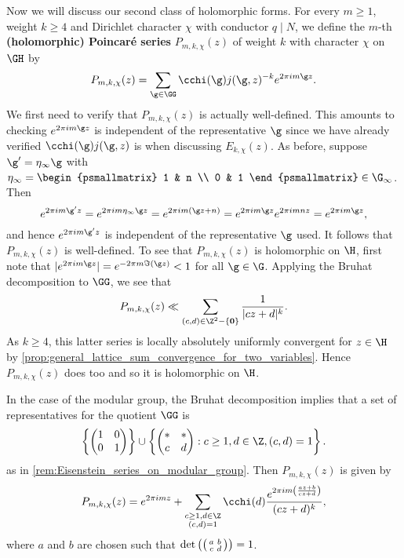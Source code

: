     Now we will discuss our second class of holomorphic forms. For every $m \ge 1$, weight $k \ge 4$ and Dirichlet character $\chi$ with conductor $q \mid N$, we define the $m$-th \textbf{(holomorphic) Poincar\'e series} $P_{m,k,\chi}(z)$ of weight $k$ with character $\chi$ on $\GH$ by
    \[
      P_{m,k,\chi}(z) = \sum_{\g \in \GG}\cchi(\g)j(\g,z)^{-k}e^{2\pi im\g z}.
    \]
    We first need to verify that $P_{m,k,\chi}(z)$ is actually well-defined. This amounts to checking $e^{2\pi im\g z}$ is independent of the representative $\g$ since we have already verified $\cchi(\g)j(\g,z)$ is when discussing $E_{k,\chi}(z)$. As before, suppose $\g' = \eta_{\infty}\g$ with $\eta_{\infty} = \begin{psmallmatrix} 1 & n \\ 0 & 1 \end{psmallmatrix} \in \G_{\infty}$. Then
    \[
      e^{2\pi im\g' z} = e^{2\pi im\eta_{\infty}\g z} = e^{2\pi im(\g z+n)} = e^{2\pi im\g z}e^{2\pi imnz} = e^{2\pi im\g z},
    \]
    and hence $e^{2\pi im\g' z}$ is independent of the representative $\g$ used. It follows that $P_{m,k,\chi}(z)$ is well-defined. To see that $P_{m,k,\chi}(z)$ is holomorphic on $\H$, first note that $|e^{2\pi im\g z}| = e^{-2\pi m\Im(\g z)} < 1$ for all $\g \in \G$. Applying the Bruhat decomposition to $\GG$, we see that
    \[
      P_{m,k,\chi}(z) \ll \sum_{(c,d) \in \Z^{2}-\{\mathbf{0}\}}\frac{1}{|cz+d|^{k}}.
    \]
    As $k \ge 4$, this latter series is locally absolutely uniformly convergent for $z \in \H$ by \cref{prop:general_lattice_sum_convergence_for_two_variables}. Hence $P_{m,k,\chi}(z)$ does too and so it is holomorphic on $\H$.

    \begin{remark}
      In the case of the modular group, the Bruhat decomposition implies that a set of representatives for the quotient $\GG$ is
    \[
      \left\{\begin{pmatrix} 1 & 0 \\ 0 & 1 \end{pmatrix}\right\} \cup \left\{\begin{pmatrix} \ast & \ast \\ c & d \end{pmatrix}:c \ge 1, d \in \Z, (c,d) = 1\right\}.
    \]
    as in \cref{rem:Eisenstein_series_on_modular_group}. Then $P_{m,k,\chi}(z)$ is given by
      \[
        P_{m,k,\chi}(z) = e^{2\pi imz}+\sum_{\substack{c \ge 1, d \in \Z \\ (c,d) = 1}}\cchi(d)\frac{e^{2\pi im\left(\frac{az+b}{cz+d}\right)}}{(cz+d)^{k}},
      \]
      where $a$ and $b$ are chosen such that $\det\left(\begin{psmallmatrix} a & b \\ c & d \end{psmallmatrix}\right) = 1$.
    \end{remark}


